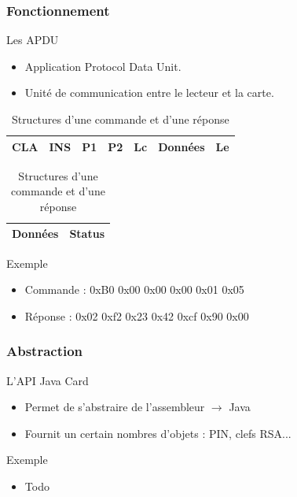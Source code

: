 \documentclass{beamer}
\begin{document}
\begin{frame}
    \frametitle{Fonctionnement}
    \begin{block}{Les APDU}
        \begin{itemize}
            \item Application Protocol Data Unit.
            \item Unité de communication entre le lecteur et la carte.
        \end{itemize}
    \end{block}
    \begin{table}
        \begin{tabular}{|c|c|c|c|c|c|c|}
            \hline
            CLA & INS & P1 & P2 & Lc & Données & Le\\
            \hline
        \end{tabular}
        \newline
        \begin{tabular}{|c|c|}
            \hline
            Données & Status\\
            \hline
        \end{tabular}
        \caption{Structures d'une commande et d'une réponse}
    \end{table}
    \begin{block}{Exemple}
        \begin{itemize}
            \item Commande : 0xB0 0x00 0x00 0x00 0x01 0x05
            \item Réponse : 0x02 0xf2 0x23 0x42 0xcf 0x90 0x00
        \end{itemize}
    \end{block}
\end{frame}

\begin{frame}
    \frametitle{Abstraction}
    \begin{block}{L'API Java Card}
        \begin{itemize}
            \item Permet de s'abstraire de l'assembleur $\rightarrow$ Java
            \item Fournit un certain nombres d'objets : PIN, clefs RSA...
        \end{itemize}
    \end{block}
    \begin{block}{Exemple}
        \begin{itemize}
            \item Todo
        \end{itemize}
    \end{block}
\end{frame}
\end{document}
